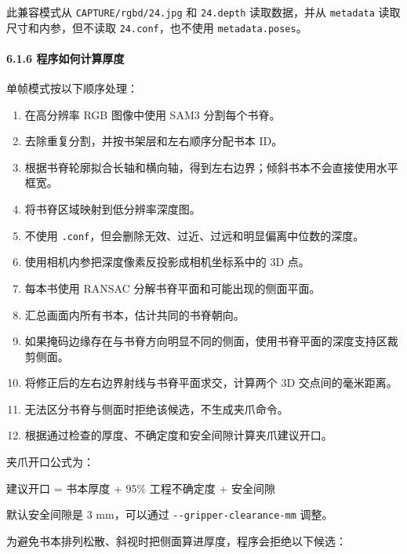 \documentclass[
  chinese,
  11pt,
  a4paper,
]{article}
\newenvironment{Shaded}{\begin{snugshade}}{\end{snugshade}}
\newcommand{\NormalTok}[1]{#1}
\providecommand{\tightlist}{%
  \setlength{\itemsep}{0pt}\setlength{\parskip}{0pt}}
\begin{document}
此兼容模式从 \texttt{CAPTURE/rgbd/24.jpg} 和 \texttt{24.depth}
读取数据，并从 \texttt{metadata} 读取尺寸和内参，但不读取
\texttt{24.conf}，也不使用 \texttt{metadata.poses}。

\paragraph{6.1.6
程序如何计算厚度}\label{616-ux7a0bux5e8fux5982ux4f55ux8ba1ux7b97ux539aux5ea6}

单帧模式按以下顺序处理：

\begin{enumerate}
\def\labelenumi{\arabic{enumi}.}
\tightlist
\item
  在高分辨率 RGB 图像中使用 SAM3 分割每个书脊。
\item
  去除重复分割，并按书架层和左右顺序分配书本 ID。
\item
  根据书脊轮廓拟合长轴和横向轴，得到左右边界；倾斜书本不会直接使用水平框宽。
\item
  将书脊区域映射到低分辨率深度图。
\item
  不使用
  \texttt{.conf}，但会删除无效、过近、过远和明显偏离中位数的深度。
\item
  使用相机内参把深度像素反投影成相机坐标系中的 3D 点。
\item
  每本书使用 RANSAC 分解书脊平面和可能出现的侧面平面。
\item
  汇总画面内所有书本，估计共同的书脊朝向。
\item
  如果掩码边缘存在与书脊方向明显不同的侧面，使用书脊平面的深度支持区裁剪侧面。
\item
  将修正后的左右边界射线与书脊平面求交，计算两个 3D 交点间的毫米距离。
\item
  无法区分书脊与侧面时拒绝该候选，不生成夹爪命令。
\item
  根据通过检查的厚度、不确定度和安全间隙计算夹爪建议开口。
\end{enumerate}

夹爪开口公式为：

\begin{Shaded}
\begin{Highlighting}[]
\NormalTok{建议开口 = 书本厚度 + 95\% 工程不确定度 + 安全间隙}
\end{Highlighting}
\end{Shaded}

默认安全间隙是 3 mm，可以通过 \texttt{-\/-gripper-clearance-mm} 调整。

为避免书本排列松散、斜视时把侧面算进厚度，程序会拒绝以下候选：
\end{document}
